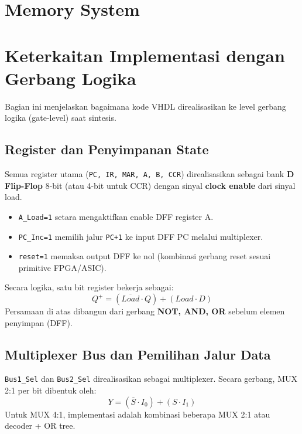 \documentclass[12pt,a4paper]{report}
\begin{document}


\section{Memory System}



\section{Keterkaitan Implementasi dengan Gerbang Logika}

Bagian ini menjelaskan bagaimana kode VHDL direalisasikan ke level gerbang logika (gate-level) saat sintesis.

\subsection{Register dan Penyimpanan State}

Semua register utama (\texttt{PC, IR, MAR, A, B, CCR}) direalisasikan sebagai bank \textbf{D Flip-Flop} 8-bit (atau 4-bit untuk CCR) dengan sinyal \textbf{clock enable} dari sinyal load.

\begin{itemize}
  \item \texttt{A\_Load=1} setara mengaktifkan enable DFF register A.
  \item \texttt{PC\_Inc=1} memilih jalur \texttt{PC+1} ke input DFF PC melalui multiplexer.
  \item \texttt{reset=1} memaksa output DFF ke nol (kombinasi gerbang reset sesuai primitive FPGA/ASIC).
\end{itemize}

Secara logika, satu bit register bekerja sebagai:
\[
Q^{+} = (\overline{Load} \cdot Q) + (Load \cdot D)
\]
Persamaan di atas dibangun dari gerbang \textbf{NOT, AND, OR} sebelum elemen penyimpan (DFF).

\subsection{Multiplexer Bus dan Pemilihan Jalur Data}

\texttt{Bus1\_Sel} dan \texttt{Bus2\_Sel} direalisasikan sebagai multiplexer. Secara gerbang, MUX 2:1 per bit dibentuk oleh:
\[
Y = (\overline{S}\cdot I_0) + (S\cdot I_1)
\]
Untuk MUX 4:1, implementasi adalah kombinasi beberapa MUX 2:1 atau decoder + OR tree.
\end{document}
